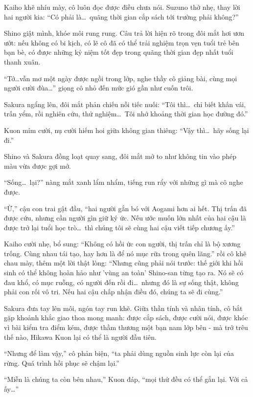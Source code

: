\documentclass[../main.tex]{subfiles}
\begin{document}
Kaiho khẽ nhíu mày, cô luôn đọc được điều chưa nói. Suzuno thở nhẹ, thay lời hai người kia: ``Có phải là\dots\ quãng thời gian cắp sách tới trường phải không?''

Shino giật mình, khóe môi rung rung. Câu trả lời hiện rõ trong đôi mắt hơi ươn ướt: nếu không có bi kịch, có lẽ cô đã có thể trải nghiệm trọn vẹn tuổi trẻ bên bạn bè, có được những kỷ niệm tốt đẹp trong quãng thời gian đẹp nhất tuổi thanh xuân.

``Tớ\dots vẫn mơ một ngày được ngồi trong lớp, nghe thầy cô giảng bài, cùng mọi người cười đùa\dots'' giọng cô nhỏ đến mức gió gần như cuốn trôi.

Sakura ngẩng lên, đôi mắt phản chiếu nỗi tiếc nuối: ``Tôi thì\dots\ chỉ biết khấn vái, trấn yểm, rồi nghiên cứu, thử nghiệm\dots\ Tôi nhớ khoảng thời gian học đường đó.''

Kuon mỉm cười, nụ cười hiếm hoi giữa không gian thiêng: ``Vậy thì\dots\ hãy sống lại đi.''

Shino và Sakura đồng loạt quay sang, đôi mắt mở to như không tin vào phép màu vừa được gợi mở.

``Sống\dots\ lại?'' nàng mắt xanh lẩm nhẩm, tiếng run rẩy với những gì mà cô nghe được.

``Ừ,'' cậu con trai gật đầu, ``hai người gắn bó với Aogami hơn ai hết. Thị trấn đã được cứu, nhưng cần người gìn giữ ký ức. Nếu ước muốn lớn nhất của hai cậu là được trở lại tuổi học trò\dots\ thì chúng tôi sẽ cùng hai cậu viết tiếp chương ấy.''

Kaiho cười nhẹ, bổ sung: ``Không có hồi ức con người, thị trấn chỉ là bộ xương trống. Cùng nhau tái tạo, hay hơn là để nó mục rữa trong quên lãng.'' rồi cô khẽ chau mày, thêm một lời thật lòng: ``Nhưng cũng phải nói trước: thế giới khi hồi sinh có thể không hoàn hảo như 'vùng an toàn' Shino-san từng tạo ra. Nó sẽ có đau khổ, có mục ruỗng, có người đến rồi đi\dots\ nhưng đó là sự sống thật, không phải con rối vô tri. Nếu hai cậu chấp nhận điều đó, chúng ta sẽ đi cùng.''

Sakura đưa tay lên môi, ngón tay run khẽ. Giữa thần tính và nhân tính, cô bắt gặp khoảnh khắc giao thoa mong manh: được cắp sách, được cười nói, được khóc vì bài kiểm tra điểm kém, được thầm thương một bạn nam lớp bên - mà trớ trêu thế nào, Hikawa Kuon lại có thể là người đầu tiên.

``Nhưng để làm vậy,'' cô phản biện, ``ta phải dùng nguồn sinh lực còn lại của rừng. Quá trình hồi phục sẽ chậm lại.''

``Miễn là chúng ta còn bên nhau,'' Kuon đáp, ``mọi thứ đều có thể gắn lại. Với cả ấy\dots''
\end{document}
